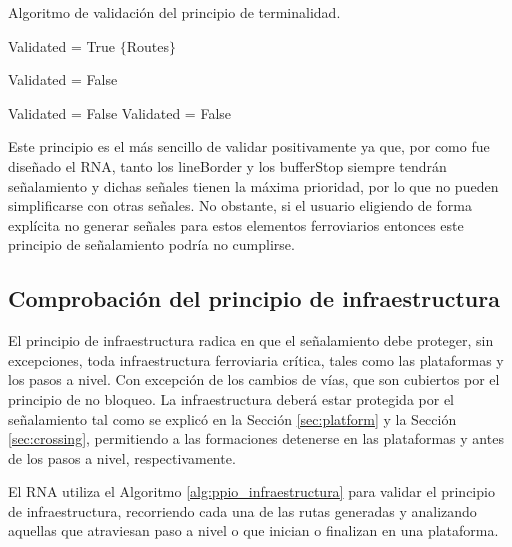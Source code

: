 		\begin{algorithm}[H]
			\caption{Algoritmo de validación del principio de terminalidad.}\label{alg:ppio_terminalidad}
			\DontPrintSemicolon
			\SetNoFillComment
			\LinesNotNumbered 
			Validated = True\;
			$\{$Routes$\}$\; 
			{
				{
					{
						Validated = False\;
					}
				}
				
				{
					{
						Validated = False\;
					}
					{
						Validated = False\;
					}
				}
			}
			
		\end{algorithm}
		
		Este principio es el más sencillo de validar positivamente ya que, por como fue diseñado el RNA, tanto los lineBorder y los bufferStop siempre tendrán señalamiento y dichas señales tienen la máxima prioridad, por lo que no pueden simplificarse con otras señales. No obstante, si el usuario eligiendo de forma explícita no generar señales para estos elementos ferroviarios entonces este principio de señalamiento podría no cumplirse.		
				
	\subsection{Comprobación del principio de infraestructura}
		
		El principio de infraestructura radica en que el señalamiento debe proteger, sin excepciones, toda infraestructura ferroviaria crítica, tales como las plataformas y los pasos a nivel. Con excepción de los cambios de vías, que son cubiertos por el principio de no bloqueo. La infraestructura deberá estar protegida por el señalamiento tal como se explicó en la Sección \ref{sec:platform} y la Sección \ref{sec:crossing}, permitiendo a las formaciones detenerse en las plataformas y antes de los pasos a nivel, respectivamente.

		El RNA utiliza el Algoritmo \ref{alg:ppio_infraestructura} para validar el principio de infraestructura, recorriendo cada una de las rutas generadas y analizando aquellas que atraviesan paso a nivel o que inician o finalizan en una plataforma. 
		
